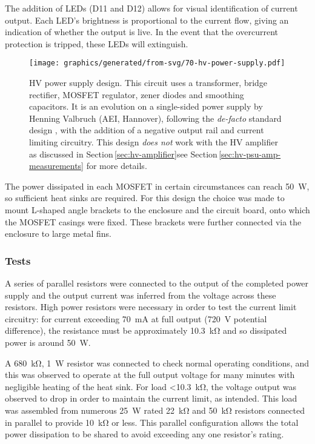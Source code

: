 The addition of \gls{LED}s (D11 and D12) allows for visual identification of current output. Each \gls{LED}'s brightness is proportional to the current flow, giving an indication of whether the output is live. In the event that the overcurrent protection is tripped, these \gls{LED}s will extinguish.

\begin{figure}
  \centering
  \texttt{[image: graphics/generated/from-svg/70-hv-power-supply.pdf]}
  \caption{\gls{HV} power supply design. This circuit uses a transformer, bridge rectifier, \gls{MOSFET} regulator, zener diodes and smoothing capacitors. It is an evolution on a single-sided power supply by Henning Valbruch (AEI, Hannover), following the \emph{de-facto} standard design \cite{Horowitz2015}, with the addition of a negative output rail and current limiting circuitry. This design \emph{does not} work with the \gls{HV} amplifier as discussed in Section\,\ref{sec:hv-amplifier}\textemdash see Section\,\ref{sec:hv-psu-amp-measurements} for more details.}
  \label{fig:hv-power-supply}
\end{figure}

The power dissipated in each \gls{MOSFET} in certain circumstances can reach \SI{50}{\watt}, so sufficient heat sinks are required. For this design the choice was made to mount L-shaped angle brackets to the enclosure and the circuit board, onto which the \gls{MOSFET} casings were fixed. These brackets were further connected via the enclosure to large metal fins. 

\subsubsection{\label{sec:hv-psu-tests}Tests}

A series of parallel resistors were connected to the output of the completed power supply and the output current was inferred from the voltage across these resistors. High power resistors were necessary in order to test the current limit circuitry: for current exceeding \SI{70}{\milli\ampere} at full output (\SI{720}{\volt} potential difference), the resistance must be approximately \SI{10.3}{\kilo\ohm} and so dissipated power is around \SI{50}{\watt}.

A \SI{680}{\kilo\ohm}, \SI{1}{\watt} resistor was connected to check normal operating conditions, and this was observed to operate at the full output voltage for many minutes with negligible heating of the heat sink. For load \SI{<10.3}{\kilo\ohm}, the voltage output was observed to drop in order to maintain the current limit, as intended. This load was assembled from numerous \SI{25}{\watt} rated \SI{22}{\kilo\ohm} and \SI{50}{\kilo\ohm} resistors connected in parallel to provide \SI{10}{\kilo\ohm} or less. This parallel configuration allows the total power dissipation to be shared to avoid exceeding any one resistor's rating.

